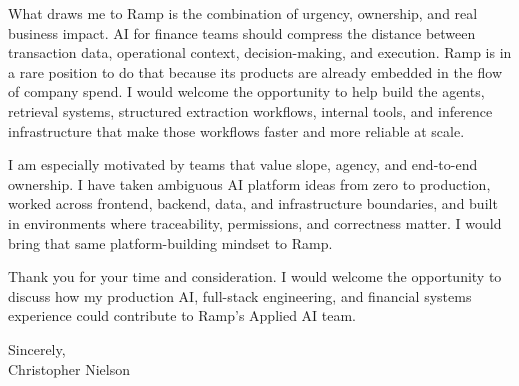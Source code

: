 \documentclass[11pt]{article}
\begin{document}
What draws me to Ramp is the combination of urgency, ownership, and real business impact. AI for finance teams should compress the distance between transaction data, operational context, decision-making, and execution. Ramp is in a rare position to do that because its products are already embedded in the flow of company spend. I would welcome the opportunity to help build the agents, retrieval systems, structured extraction workflows, internal tools, and inference infrastructure that make those workflows faster and more reliable at scale.

I am especially motivated by teams that value slope, agency, and end-to-end ownership. I have taken ambiguous AI platform ideas from zero to production, worked across frontend, backend, data, and infrastructure boundaries, and built in environments where traceability, permissions, and correctness matter. I would bring that same platform-building mindset to Ramp.

Thank you for your time and consideration. I would welcome the opportunity to discuss how my production AI, full-stack engineering, and financial systems experience could contribute to Ramp's Applied AI team.

\vspace{0.35em}
Sincerely,\\[0.35em]
Christopher Nielson
\end{document}
